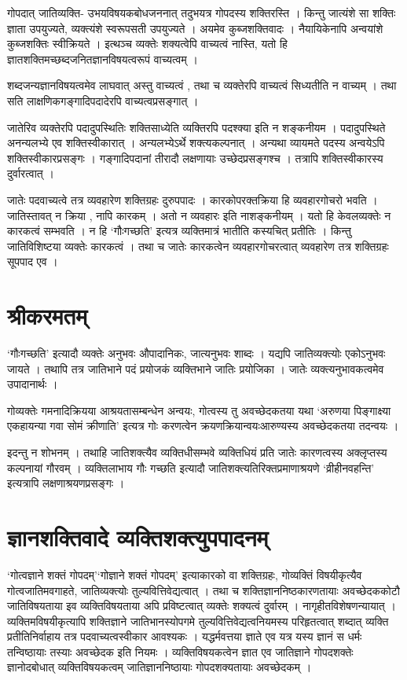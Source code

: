 {गोपदात् जातिव्यक्ति- उभयविषयकबोधजननात् तदुभयत्र गोपदस्य शक्तिरस्ति । किन्तु जात्यंशे सा शक्तिः ज्ञाता उपयुज्यते, व्यक्त्यंशे स्वरूपसती उपयुज्यते । अयमेव कुब्जशक्तिवादः । नैयायिकेनापि अन्वयांशे कुब्जशक्तिः स्वीक्रियते । इत्थञ्च व्यक्तेः शक्यत्वेपि वाच्यत्वं नास्ति, यतो हि ज्ञातशक्तिमच्छब्दजनितज्ञानविषयत्वरूपं वाच्यत्वम् । 

शब्दजन्यज्ञानविषयत्वमेव लाघवात् अस्तु वाच्यत्वं , तथा च व्यक्तेरपि वाच्यत्वं       सिध्यतीति न वाच्यम् । तथा सति लाक्षणिकगङ्गादिपदादेरपि वाच्यत्वप्रसङ्गात् । 

जातेरिव व्यक्तेरपि पदादुपस्थितिः शक्तिसाध्येति व्यक्तिरपि पदश्क्या इति न शङ्कनीयम । पदादुपस्थिते अनन्यलभ्ये एव शक्तिस्वीकारात् । अन्यलभ्येऽर्थे शक्त्यकल्पनात् । अन्यथा व्यायमते पदस्य अन्वयेऽपि शक्तिस्वीकारप्रसङ्गः । गङ्गादिपदानां तीरादौ लक्षणायाः उच्छेदप्रसङ्गश्च । तत्रापि शक्तिस्वीकारस्य दुर्वारत्वात् ।

जातेः पदवाच्यत्वे तत्र व्यवहारेण  शक्तिग्रहः दुरुपपादः । कारकोपरक्तक्रिया हि व्यवहारगोचरो भवति । जातिस्तावत् न क्रिया , नापि कारकम् । अतो न व्यवहारः इति नाशङ्कनीयम् । यतो हि केवलव्यक्तेः न कारकत्वं सम्भवति । न हि ‘गौःगच्छति’ इत्यत्र व्यक्तिमात्रं भातीति कस्यचित् प्रतीतिः । किन्तु जातिविशिष्टया व्यक्तेः कारकत्वं । तथा च जातेः कारकत्वेन व्यवहारगोचरत्वात् व्यवहारेण तत्र शक्तिग्रहः सूपपाद एव ।

\section*{श्रीकरमतम्}

‘गौःगच्छति’ इत्यादौ व्यक्तेः अनुभवः औपादानिकः, जात्यनुभवः शाब्दः । यद्यपि जातिव्यक्त्योः एकोऽनुभवः जायते । तथापि तत्र जातिभाने पदं प्रयोजकं व्यक्तिभाने जातिः प्रयोजिका । जातेः व्यक्त्यनुभावकत्वमेव उपादानार्थः ।

गोव्यक्तेः गमनादिक्रियया आश्रयतासम्बन्धेन अन्वयः, गोत्वस्य तु अवच्छेदकतया यथा ‘अरुणया पिङ्गाक्ष्या एकहायन्या गवा सोमं क्रीणाति’ इत्यत्र गोः करणत्वेन क्रयणक्रियान्वयःआरुण्यस्य अवच्छेदकतया तदन्वयः ।

इदन्तु न शोभनम् । तथाहि जातिशक्त्यैव व्यक्तिधीसम्भवे व्यक्तिधियं प्रति जातेः कारणत्वस्य अक्लृप्तस्य कल्पनायां गौरवम् । व्यक्तिलाभाय गौः गच्छति इत्यादौ जातिशक्त्यतिरिक्तप्रमाणाश्रयणे ‘व्रीहीनवहन्ति’ इत्यत्रापि लक्षणाश्रयणप्रसङ्गः । 

\section*{ज्ञानशक्तिवादे व्यक्तिशक्त्युपपादनम्}

‘गोत्वज्ञाने शक्तं गोपदम्’‘गोज्ञाने शक्तं गोपदम्’ इत्याकारको वा शक्तिग्रहः, गोव्यक्तिं विषयीकृत्यैव गोत्वजातिमवगाहते, जातिव्यक्त्योः      तुल्यवित्तिवेद्यत्वात् । तथा च शक्तिज्ञाननिष्ठकारणतायाः अवच्छेदककोटौ जातिविषयताया इव व्यक्तिविषयताया अपि प्रविष्टत्वात् व्यक्तेः शक्यत्वं दुर्वारम् । नागृहीतविशेषणन्यायात् । व्यक्तिमविषयीकृत्यापि शक्तिज्ञाने जातिभानस्योपगमे तुल्यवित्तिवेद्यत्वनियमस्य परिहृतत्वात् शब्दात् व्यक्ति प्रतीतिनिर्वाहाय तत्र पदवाच्यत्वस्वीकार आवश्यकः । यद्धर्मवत्तया ज्ञाते एव यत्र यस्य ज्ञानं    स धर्मः तन्विष्ठायाः तस्याः अवच्छेदक इति नियमः । व्यक्तिविषयकत्वेन ज्ञात एव जातिज्ञाने गोपदशक्तेः ज्ञानोदबोधात् व्यक्तिविषयकत्वम् जातिज्ञाननिष्ठायाः गोपदशक्यतायाः अवच्छेदकम् । 

}
